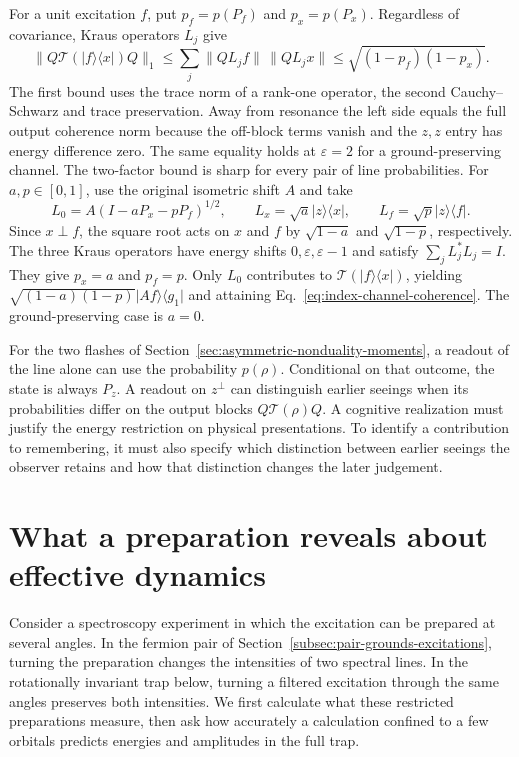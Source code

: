 \documentclass[11pt]{article}
\theoremstyle{definition}
\newcommand{\ket}[1]{\lvert #1\rangle}
\newcommand{\bra}[1]{\langle #1\rvert}
\begin{document}
For a unit excitation $f$, put $p_f=p(P_f)$ and $p_x=p(P_x)$. Regardless of covariance, Kraus operators $L_j$ give
\begin{equation}
 \bigl\|Q\mathcal T(\ket{f}\bra{x})Q\bigr\|_1
 \le \sum_j\|QL_j f\|\,\|QL_j x\|
 \le \sqrt{(1-p_f)(1-p_x)} .
 \label{eq:index-channel-coherence}
\end{equation}
The first bound uses the trace norm of a rank-one operator, the second Cauchy--Schwarz and trace preservation. Away from resonance the left side equals the full output coherence norm because the off-block terms vanish and the $z,z$ entry has energy difference zero. The same equality holds at $\varepsilon=2$ for a ground-preserving channel. The two-factor bound is sharp for every pair of line probabilities. For $a,p\in[0,1]$, use the original isometric shift $A$ and take
\[
 L_0=A(I-aP_x-pP_f)^{1/2},\qquad
 L_x=\sqrt{a}\ket{z}\bra{x},\qquad L_f=\sqrt{p}\ket{z}\bra{f}.
\]
Since $x\perp f$, the square root acts on $x$ and $f$ by $\sqrt{1-a}$ and $\sqrt{1-p}$, respectively. The three Kraus operators have energy shifts $0,\varepsilon,\varepsilon-1$ and satisfy $\sum_jL_j^*L_j=I$. They give $p_x=a$ and $p_f=p$. Only $L_0$ contributes to $\mathcal T(\ket{f}\bra{x})$, yielding $\sqrt{(1-a)(1-p)}\ket{Af}\bra{g_1}$ and attaining Eq.~\eqref{eq:index-channel-coherence}. The ground-preserving case is $a=0$.

For the two flashes of Section~\ref{sec:asymmetric-nonduality-moments}, a readout of the line alone can use the probability $p(\rho)$. Conditional on that outcome, the state is always $P_z$. A readout on $z^\perp$ can distinguish earlier seeings when its probabilities differ on the output blocks $Q\mathcal T(\rho)Q$. A cognitive realization must justify the energy restriction on physical presentations. To identify a contribution to remembering, it must also specify which distinction between earlier seeings the observer retains and how that distinction changes the later judgement.

\section{What a preparation reveals about effective dynamics}
\label{sec:preparation-effective-dynamics}

Consider a spectroscopy experiment in which the excitation can be prepared at several angles. In the fermion pair of Section~\ref{subsec:pair-grounds-excitations}, turning the preparation changes the intensities of two spectral lines. In the rotationally invariant trap below, turning a filtered excitation through the same angles preserves both intensities. We first calculate what these restricted preparations measure, then ask how accurately a calculation confined to a few orbitals predicts energies and amplitudes in the full trap.
\end{document}

